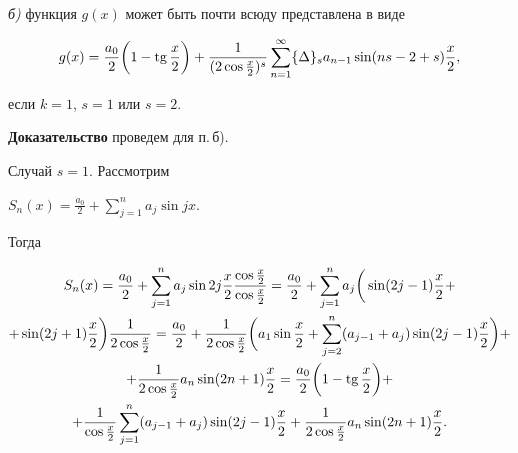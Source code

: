 \begin{lem}
{\em б)} функция $g(x)$ может быть почти всюду представлена в виде





\begin{equation}


g(x)=\frac{a_0}{2}\bigg(1-\tg{\frac{x}{2}}\bigg)+


\frac{1}{(2\cos{\frac{x}{2}})^s}


\sum\limits_{n=1}^{\infty}\{\Delta\}_s a_{n-1}\sin (ns-2+s)


{\frac{x}{2}},


\end{equation}


если $k=1$, $s=1$ или $s=2$.


\end{lem}





{\bf Доказательство} проведем для п.\,б).





Случай $s=1$. Рассмотрим


$S_n(x)=\frac{a_0}{2}+\sum\limits_{j=1}^{n}a_j\sin jx$.


Тогда


\begin{gather*}


S_n(x)=\frac{a_0}{2}+\sum\limits_{j=1}^{n} a_j\sin 2j{\frac{x}{2}} 


\frac{\cos{\frac{x}{2}}}{\cos{\frac{x}{2}}}=


\frac{a_0}{2}+\sum\limits_{j=1}^{n} a_j\bigg(\sin (2j-1){\frac{x}{2}} +\\


%


+\sin(2j+1){\frac{x}{2}}\bigg)\frac{1}{2\cos{\frac{x}{2}}}=


\frac{a_0}{2}+\frac{1}{2\cos{\frac{x}{2}}}\bigg(a_1\sin{\frac{x}{2}}+


\sum\limits_{j=2}^{n}(a_{j-1}+a_j)


\sin(2j-1){\frac{x}{2}}\bigg)+\\


%


+\frac{1}{2\cos{\frac{x}{2}}}a_n\sin(2n+1){\frac{x}{2}}=


\frac{a_0}{2}\bigg(1-\tg{\frac{x}{2}}\bigg)+\\


%


+\frac{1}{\cos{\frac{x}{2}}}


\sum\limits_{j=1}^{n}(a_{j-1}+a_j)\sin(2j-1){\frac{x}{2}}


+\frac{1}{2\cos{\frac{x}{2}}}a_n\sin(2n+1){\frac{x}{2}}.


\end{gather*}


